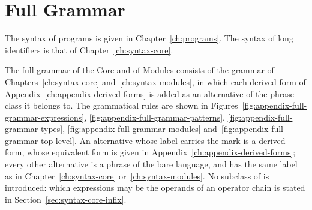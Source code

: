
\chapter{Full Grammar}\label{ch:appendix-full-grammar}

The syntax of programs is given in Chapter~\ref{ch:programs}. The syntax of
long identifiers is that of Chapter~\ref{ch:syntax-core}.

The full grammar of the Core and of Modules consists of the grammar of
Chapters~\ref{ch:syntax-core} and~\ref{ch:syntax-modules}, in which each
derived form of Appendix~\ref{ch:appendix-derived-forms} is added as an
alternative of the phrase class it belongs to. The grammatical rules are shown
in Figures~\ref{fig:appendix-full-grammar-expressions},
\ref{fig:appendix-full-grammar-patterns},
\ref{fig:appendix-full-grammar-types},
\ref{fig:appendix-full-grammar-modules}
and~\ref{fig:appendix-full-grammar-top-level}. An alternative whose label
carries the mark \fgderived{} is a derived form, whose equivalent form is
given in Appendix~\ref{ch:appendix-derived-forms}; every other alternative is
a phrase of the bare language, and has the same label as in
Chapter~\ref{ch:syntax-core} or~\ref{ch:syntax-modules}. %
No subclass of  is introduced: which expressions may be the operands
of an operator chain is stated in Section~\ref{sec:syntax-core-infix}.

